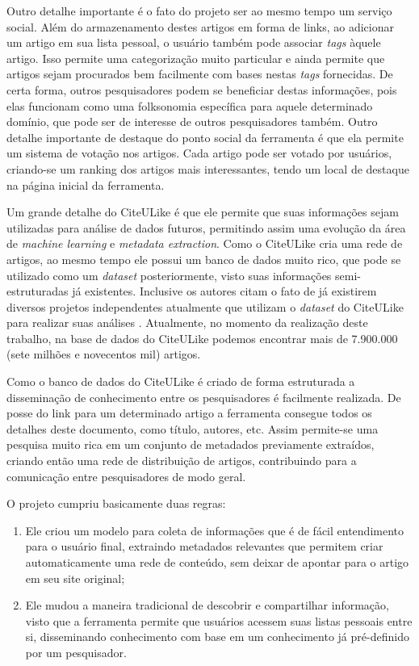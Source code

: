 Outro detalhe importante é o fato do projeto ser ao mesmo tempo um serviço social. Além do armazenamento destes artigos em forma de links, ao adicionar um artigo em sua lista pessoal, o usuário também pode associar \emph{tags} àquele artigo. Isso permite uma categorização muito particular e ainda permite que artigos sejam procurados bem facilmente com bases nestas \emph{tags} fornecidas. De certa forma, outros pesquisadores podem se beneficiar destas informações, pois elas funcionam como uma folksonomia específica para aquele determinado domínio, que pode ser de interesse de outros pesquisadores também. Outro detalhe importante de destaque do ponto social da ferramenta é que ela permite um sistema de votação nos artigos. Cada artigo pode ser votado por usuários, criando-se um ranking dos artigos mais interessantes, tendo um local de destaque na página inicial da ferramenta.

Um grande detalhe do CiteULike é que ele permite que suas informações sejam utilizadas para análise de dados futuros, permitindo assim uma evolução da área de \emph{machine learning} e \emph{metadata extraction}. Como o CiteULike cria uma rede de artigos, ao mesmo tempo ele possui um banco de dados muito rico, que pode se utilizado como um \emph{dataset} posteriormente, visto suas informações semi-estruturadas já existentes. Inclusive os autores citam o fato de já existirem diversos projetos independentes atualmente que utilizam o \emph{dataset} do CiteULike para realizar suas análises \cite{citeulike}. Atualmente, no momento da realização deste trabalho, na base de dados do CiteULike podemos encontrar mais de 7.900.000 (sete milhões e novecentos mil) artigos.

Como o banco de dados do CiteULike é criado de forma estruturada a disseminação de conhecimento entre os pesquisadores é facilmente realizada. De posse do link para um determinado artigo a ferramenta consegue todos os detalhes deste documento, como título, autores, etc. Assim permite-se uma pesquisa muito rica em um conjunto de metadados previamente extraídos, criando então uma rede de distribuição de artigos, contribuindo para a comunicação entre pesquisadores de modo geral.

O projeto cumpriu basicamente duas regras:

\begin{enumerate}
    \item Ele criou um modelo para coleta de informações que é de fácil entendimento para o usuário final, extraindo metadados relevantes que permitem criar automaticamente uma rede de conteúdo, sem deixar de apontar para o artigo em seu site original;
    \item Ele mudou a maneira tradicional de descobrir e compartilhar informação, visto que a ferramenta permite que usuários acessem suas listas pessoais entre si, disseminando conhecimento com base em um conhecimento já pré-definido por um pesquisador.
\end{enumerate}

